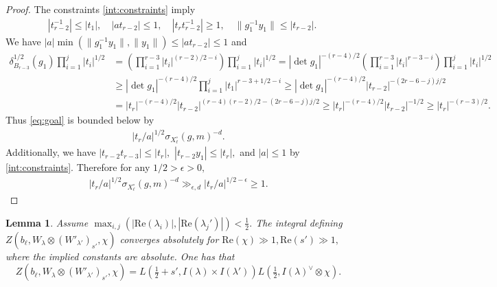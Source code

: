\documentclass[12pt]{amsart}
\newtheorem{lem}[thm]{Lemma}
\theoremstyle{remark}
\numberwithin{equation}{section}
\theoremstyle{definition}
\numberwithin{equation}{subsection}
\newcommand{\norm}[1]{\lVert#1\rVert}
\begin{document}
\begin{proof}
The constraints \eqref{int:constraints} imply
\begin{align*}
   &|t_{r-2}^{-1}|\le |t_1|, \quad |at_{r-2}|\le 1, \quad |t_rt_{r-2}^{-1}|\ge 1, \quad \norm{g_1^{-1}y_1}\le |t_{r-2}|.
\end{align*}
We have
$
    |a|\min\left(\norm{g_1^{-1}y_1},\norm{y_1}\right)\le |at_{r-2}|\le 1$
and 
\begin{align*}
    \delta_{B_{r-3}}^{1/2}(g_1)\prod_{i=1}^j |t_i|^{1/2}&= \left(\prod_{i=1}^{r-3} |t_i|^{(r-2)/2-i}\right)\prod_{i=1}^j |t_i|^{1/2}=|\det g_1|^{-(r-4)/2}\left(\prod_{i=1}^{r-3} |t_i|^{r-3-i}\right)\prod_{i=1}^j |t_i|^{1/2}\\
    &\ge |\det g_1|^{-(r-4)/2}\prod_{i=1}^{j} |t_1|^{r-3+1/2-i}\ge |\det g_1|^{-(r-4)/2}|t_{r-2}|^{-(2r-6-j)j/2}\\
    &=|t_r|^{-(r-4)/2}|t_{r-2}|^{(r-4)(r-2)/2-(2r-6-j)j/2}\ge |t_r|^{-(r-4)/2}|t_{r-2}|^{-1/2}\ge |t_r|^{-(r-3)/2}.
\end{align*}
Thus \eqref{eq:goal} is bounded below by 
\begin{align*}
    |t_r/a|^{1/2} \sigma_{X_\ell^\circ}(g,m)^{-d}.
\end{align*}
Additionally, we have 
$
    |t_{r-2}t_{r-3}|\le |t_r|,$ $|t_{r-2}y_1|\le |t_r|,$ and $|a| \leq 1$ by \eqref{int:constraints}.
Therefore for any $1/2>\epsilon>0,$
\begin{align*}
    |t_r/a|^{1/2} \sigma_{X_\ell^\circ}(g,m)^{-d}\gg_{\epsilon,d} |t_r/a|^{1/2-\epsilon}\ge 1.
\end{align*}
\end{proof}










\begin{lem} \label{unramifiedcomp}
Assume $\max_{i,j}(|\mathrm{Re}(\lambda_i)|,|\mathrm{Re}(\lambda_j')|)<\tfrac{1}{2}.$ The integral defining $
Z(b_{\ell},W_{\lambda}\otimes (W'_{\lambda'})_{s'},\chi)$
converges absolutely for $ \mathrm{Re}(\chi) \gg 1,  \mathrm{Re}(s') \gg 1,$ where the implied constants are absolute.
One has that
$$Z(b_{\ell},W_{\lambda}\otimes (W'_{\lambda'})_{s'},\chi)=L(\tfrac{1}{2}+s',I(\lambda) \times I(\lambda'))L(\tfrac{1}{2},I(\lambda)^{\vee} \otimes \chi).$$
\end{lem}
\end{document}

